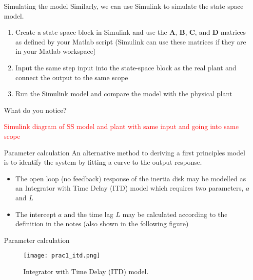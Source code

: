 \documentclass[9pt]{beamer-control}
\begin{document}
\begin{frame}{Simulating the model}
Similarly, we can use Simulink to simulate the state space model.
\begin{enumerate}
	\item Create a state-space block in Simulink and use the $\mathbf{A}$, $\mathbf{B}$, $\mathbf{C}$, and $\mathbf{D}$ matrices as defined by your Matlab script (Simulink can use these matrices if they are in your Matlab workspace)
	\item Input the same step input into the state-space block as the real plant and connect the output to the same scope
	\item Run the Simulink model and compare the model with the physical plant
\end{enumerate}

What do you notice?


\textcolor{red}{Simulink diagram of SS model and plant with same input and going into same scope}

\end{frame}





\begin{frame}{Parameter calculation}
An alternative method to deriving a first principles model is to identify the system by fitting a curve to the output response. 

\begin{itemize}
	\item The open loop (no feedback) response of the inertia disk may be modelled as an Integrator with Time Delay (ITD) model which requires two parameters, $a$ and $L$
	\item The intercept $a$ and the time lag $L$ may be calculated according to the definition in the notes (also shown in the following figure)
\end{itemize}


\end{frame}

\begin{frame}{Parameter calculation}
	\begin{figure}
		\centering
		\texttt{[image: prac1\_itd.png]}
		\caption{Integrator with Time Delay (ITD) model.}
	\end{figure}
\end{frame}
\end{document}
